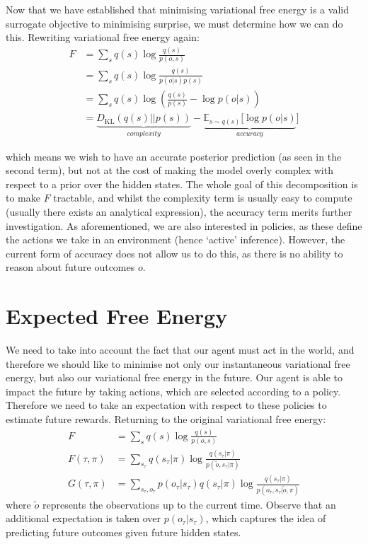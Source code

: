 \documentclass{article}
\newcommand{\KL}{\text{KL}}
\begin{document}
Now that we have established that minimising variational free energy is a valid surrogate objective to minimising surprise, we must determine how we can do this. Rewriting variational free energy again:
\begin{align}
    F &= \sum_s q(s) \log \frac{q(s)}{p(o,s)}\\
      &= \sum_s q(s) \log \frac{q(s)}{p(o|s)p(s)}\\
      &= \sum_s q(s) \log \left( \frac{q(s)}{p(s)} - \log p(o|s) \right)\\
      &= \underbrace{D_\KL(q(s)||p(s))}_{complexity} - \underbrace{\mathbb{E}_{s\sim q(s)}[\log p(o|s)}_{accuracy}]
\end{align}

which means we wish to have an accurate posterior prediction (as seen in the second term), but not at the cost of making the model overly complex with respect to a prior over the hidden states. The whole goal of this decomposition is to make $F$ tractable, and whilst the complexity term is usually easy to compute (usually there exists an analytical expression), the accuracy term merits further investigation. As aforementioned, we are also interested in policies, as these define the actions we take in an environment (hence `active' inference). However, the current form of accuracy does not allow us to do this, as there is no ability to reason about future outcomes $o$. 

\section{Expected Free Energy}

We need to take into account the fact that our agent must act in the world, and therefore we should like to minimise not only our instantaneous variational free energy, but also our variational free energy in the future. Our agent is able to impact the future by taking actions, which are selected according to a policy. Therefore we need to take an expectation with respect to these policies to estimate future rewards. Returning to the original variational free energy:
\begin{align}
    F &= \sum_s q(s) \log \frac{q(s)}{p(o,s)}\\
    F(\tau,\pi) &= \sum_{s_\tau} q(s_\tau|\pi) \log \frac{q(s_\tau|\pi)}{p(\tilde{o},s_\tau|\pi)}\\
    G(\tau,\pi) &= \sum_{s_\tau,o_\tau} p(o_\tau|s_\tau)  q(s_\tau|\pi) \log \frac{q(s_\tau|\pi)}{p(o_\tau,s_\tau|\tilde{o},\pi)}
\end{align}
where $\tilde{o}$ represents the observations up to the current time. Observe that an additional expectation is taken over $p(o_\tau|s_\tau)$, which captures the idea of predicting future outcomes given future hidden states.
\end{document}
